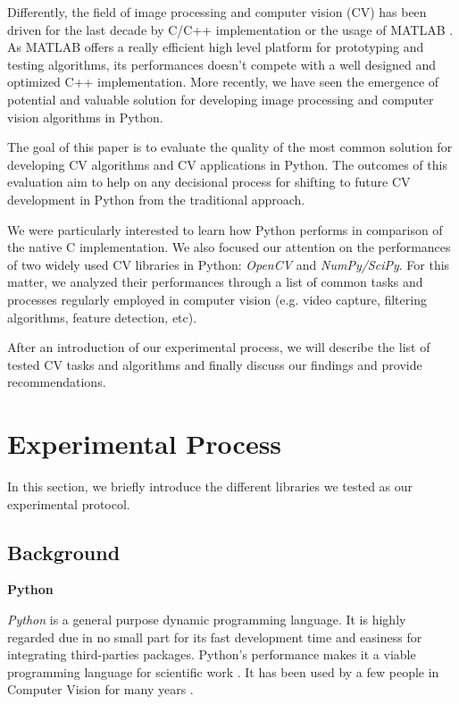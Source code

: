 \documentclass[english]{IEEEtran}
\theoremstyle{plain}
\begin{document}
Differently, the field of image processing and computer vision (CV) has been driven for the last
decade by C/C++ implementation or the usage of MATLAB \cite{}. As MATLAB offers a really efficient 
high level platform for prototyping and testing algorithms, its performances doesn't compete with a well
designed and optimized C++ implementation. More recently, we have seen the emergence of potential
and valuable solution for developing image processing and computer vision algorithms in Python.

The goal of this paper is to evaluate the quality of the most common solution for developing 
CV algorithms and CV applications in Python. The outcomes of this evaluation aim to help on any decisional process
for shifting to future CV development in Python from the traditional approach. 

We were particularly interested to learn how Python performs in comparison of the native C implementation. We also focused our attention on the performances of two widely used CV libraries in Python: \textit{OpenCV}\cite{} and \textit{NumPy/SciPy}\cite{oliphant2007python}. For this matter, we analyzed their performances through a list of common tasks and processes regularly employed in 
computer vision (e.g. video capture, filtering algorithms, feature detection, etc). 

After an introduction of our experimental process, we will describe the list of tested CV tasks and algorithms
and finally discuss our findings and provide recommendations.

\section{Experimental Process}

In this section, we briefly introduce the different libraries we tested as our 
experimental protocol.

\subsection{Background}

\textbf{Python}

\textit{Python} is a general purpose dynamic programming language\cite{entry-0}.
It is highly regarded due in no small part for its fast development
time and easiness for integrating third-parties packages\cite{sanner1999python}.
Python's performance makes it a viable programming language for scientific
work \cite{cai2005performance}. It has been used by a few people in
Computer Vision for many years \cite{doakPyCV}.
\end{document}
